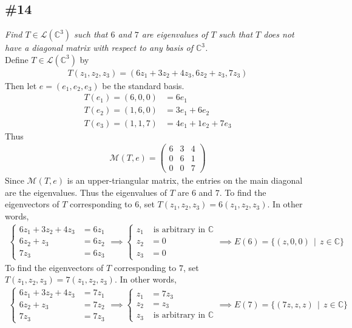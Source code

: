 \documentclass[12pt]{article}
\newcommand{\suchthat}{\, \mid \,}
\begin{document}
\subsection*{\#14}
{\it Find $T \in \mathcal{L}(\mathbb{C}^3)$ such that $6$ and $7$ are eigenvalues of $T$ such that $T$ does not have a diagonal matrix with respect to any basis of $\mathbb{C}^3$.} \\

\noindent Define $T \in \mathcal{L}(\mathbb{C}^3)$ by
\begin{align*}
	T(z_1, z_2, z_3) = (6z_1 + 3z_2 + 4z_3, 6z_2 + z_3, 7z_3)
\end{align*}
Then let $e = (e_1, e_2, e_3)$ be the standard basis.
\begin{align*}
	T(e_1) = (6, 0, 0) &= 6e_1 \\
	T(e_2) = (1, 6, 0) &= 3e_1 + 6e_2 \\
	T(e_3) = (1, 1, 7) &= 4e_1 + 1e_2 + 7e_3
\end{align*}
Thus
\begin{align*}
	\mathcal{M}(T, e) = \left(\begin{array}{ccc}
		6 & 3 & 4 \\
		0 & 6 & 1 \\
		0 & 0 & 7
	\end{array}\right)
\end{align*}
Since $\mathcal{M}(T, e)$ is an upper-triangular matrix, the entries on the main diagonal are the eigenvalues.  Thus the eigenvalues of $T$ are $6$ and $7$.  To find the eigenvectors of $T$ corresponding to $6$, set $T(z_1, z_2, z_3) = 6(z_1, z_2, z_3)$.  In other words,
\begin{align*}
	\begin{cases}
		6z_1 + 3z_2 + 4z_3 &= 6z_1 \\
		6z_2 + z_3 &= 6z_2 \\
		7z_3 &= 6z_3
	\end{cases}
	\implies\begin{cases}
		z_1 &\text{ is arbitrary in $\mathbb{C}$} \\
		z_2 &= 0 \\
		z_3 &= 0
	\end{cases}
	\implies E(6) = \{(z, 0, 0) \suchthat z \in \mathbb{C}\}
\end{align*}
To find the eigenvectors of $T$ corresponding to $7$, set $T(z_1, z_2, z_3) = 7(z_1, z_2, z_3)$.  In other words,
\begin{align*}
	\begin{cases}
		6z_1 + 3z_2 + 4z_3 &= 7z_1 \\
		6z_2 + z_3 &= 7z_2 \\
		7z_3 &= 7z_3
	\end{cases}
	\implies\begin{cases}
		z_1 &= 7z_3 \\
		z_2 &= z_3 \\
		z_3 &\text{ is arbitrary in $\mathbb{C}$}
	\end{cases}
	\implies E(7) = \{(7z, z, z) \suchthat z \in \mathbb{C}\}
\end{align*}
\end{document}

